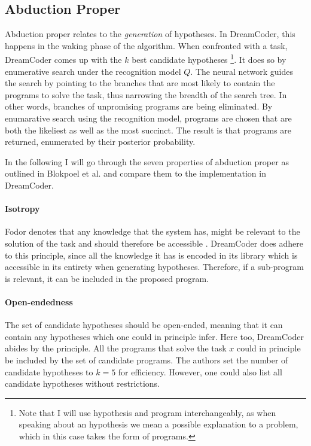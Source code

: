 \subsection{Abduction Proper}

Abduction proper relates to the \textit{generation} of hypotheses. In DreamCoder, this happens in the waking phase of the algorithm. When confronted with a task, DreamCoder comes up with the $k$ best candidate hypotheses \footnote{Note that I will use hypothesis and program interchangeably, as when speaking about an hypothesis we mean a possible explanation to a problem, which in this case takes the form of programs.}. It does so by enumerative search under the recognition model $Q$. The neural network guides the search by pointing to the branches that are most likely to contain the programs to solve the task, thus narrowing the breadth of the search tree. In other words, branches of unpromising programs are being eliminated.
By enumarative search using the recognition model, programs are chosen that are both the likeliest as well as the most succinct. The result is that programs are returned, enumerated by their posterior probability.

In the following I will go through the seven properties of abduction proper as outlined in Blokpoel et al. \cite{blokpoel2018deep} and compare them to the implementation in DreamCoder.

\paragraph{Isotropy} Fodor denotes that any knowledge that the system has, might be relevant to the solution of the task and should therefore be accessible \cite{fodor1983modularity}.
DreamCoder does adhere to this principle, since all the knowledge it has is encoded in its library which is accessible in its entirety when generating hypotheses. Therefore, if a sub-program is relevant, it can be included in the proposed program. 

\paragraph{Open-endedness} The set of candidate hypotheses should be open-ended, meaning that it can contain any hypotheses which one could in principle infer. Here too, DreamCoder abides by the principle. All the programs that solve the task $x$ could in principle be included by the set of candidate programs. The authors set the number of candidate hypotheses to $k = 5$ for efficiency. However, one could also list all candidate hypotheses without restrictions.

